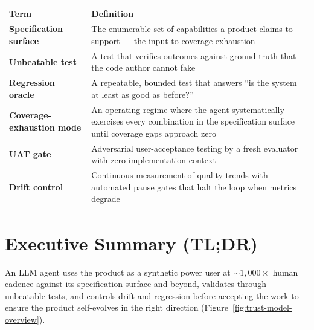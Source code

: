 \documentclass[11pt,a4paper]{article}
\newcounter{none} %
\begin{document}
{\def\LTcaptype{none} %
\begin{longtable}[]{@{}
  >{\raggedright\arraybackslash}p{}
  >{\raggedright\arraybackslash}p{}@{}}
\toprule\noalign{}
\begin{minipage}[b]{\linewidth}\raggedright
Term
\end{minipage} & \begin{minipage}[b]{\linewidth}\raggedright
Definition
\end{minipage} \\
\midrule\noalign{}
\endhead
\bottomrule\noalign{}
\endlastfoot
\textbf{Specification surface} & The enumerable set of capabilities a product claims to support --- the input to coverage-exhaustion \\
\textbf{Unbeatable test} & A test that verifies outcomes against ground truth that the code author cannot fake \\
\textbf{Regression oracle} & A repeatable, bounded test that answers ``is the system at least as good as before?'' \\
\textbf{Coverage-exhaustion mode} & An operating regime where the agent systematically exercises every combination in the specification surface until coverage gaps approach zero \\
\textbf{UAT gate} & Adversarial user-acceptance testing by a fresh evaluator with zero implementation context \\
\textbf{Drift control} & Continuous measurement of quality trends with automated pause gates that halt the loop when metrics degrade \\
\end{longtable}
}

\newpage
\section{Executive Summary (TL;DR)}\label{sec:executive-summary-tldr}

\begin{description}[style=nextline, leftmargin=1.5em, font=\bfseries]
\item[The method] An LLM agent uses the product as a synthetic power user at ${\sim}1{,}000\times$ human cadence against its specification surface and beyond, validates through unbeatable tests, and controls drift and regression before accepting the work to ensure the product self-evolves in the right direction (Figure~\ref{fig:trust-model-overview}).
\end{description}
\end{document}
